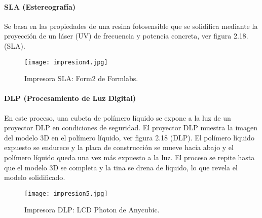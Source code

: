 \clearpage

\paragraph{SLA (Estereografía)}
Se basa en las propiedades de una resina fotosensible que se solidifica mediante la proyección de un láser (UV) de frecuencia y potencia concreta, ver figura 2.18. (SLA)\cite{impresoras3d-valverde}.

\begin{figure}[H]
	\centering
	\texttt{[image: impresion4.jpg]}
	\caption{Impresora SLA: Form2 de Formlabs.}
\end{figure}

\paragraph{DLP (Procesamiento de Luz Digital)}
En este proceso, una cubeta de polímero líquido se expone a la luz de un proyector DLP en condiciones de seguridad. El proyector DLP muestra la imagen del modelo 3D en el polímero líquido, ver figura 2.18 (DLP). El polímero líquido expuesto se endurece y la placa de construcción se mueve hacia abajo y el polímero líquido queda una vez más expuesto a la luz. El proceso se repite hasta que el modelo 3D se completa y la tina se drena de líquido, lo que revela el modelo solidificado\cite{impresoras3d-blog}.

\begin{figure}[H]
	\centering
	\texttt{[image: impresion5.jpg]}
	\caption{Impresora DLP: LCD Photon de Anycubic.}
\end{figure}

